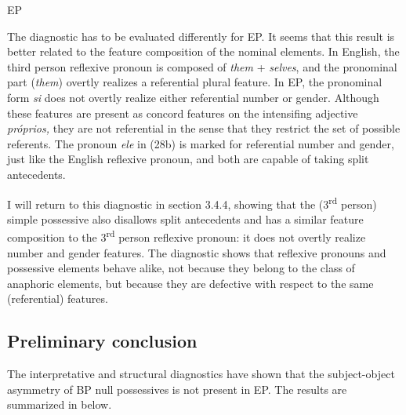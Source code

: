 \documentclass[output=paper]{langsci/langscibook}
\begin{document}
\ea%
    EP\label{ex:wein:28}\\
    \z
\z

The diagnostic has to be evaluated differently for EP. It seems that this result is better related to the feature composition of the nominal elements. In English, the third person reflexive pronoun is composed of \textit{them} + \textit{selves}, and the pronominal part (\textit{them}) overtly realizes a referential plural feature. In EP, the pronominal form \textit{si} does not overtly realize either referential number or gender. Although these features are present as concord features on the intensifing adjective \textit{próprios,} they are not referential in the sense that they restrict the set of possible referents. The pronoun \textit{ele} in (28b) is marked for referential number and gender, just like the English reflexive pronoun, and both are capable of taking split antecedents.

I will return to this diagnostic in section 3.4.4, showing that the (3\textsuperscript{rd} person) simple possessive also disallows split antecedents and has a similar feature composition to the 3\textsuperscript{rd} person reflexive pronoun: it does not overtly realize number and gender features. The diagnostic shows that reflexive pronouns and possessive elements behave alike, not because they belong to the class of anaphoric elements, but because they are defective with respect to the same (referential) features.

\subsection{Preliminary conclusion}%

The interpretative and structural diagnostics have shown that the subject-object asymmetry of BP null possessives is not present in EP. The results are summarized in  below.
\end{document}
